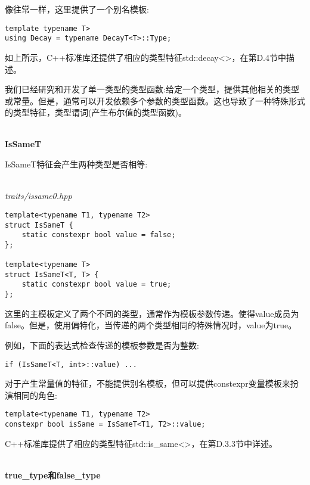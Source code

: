 像往常一样，这里提供了一个别名模板:

\begin{lstlisting}[style=styleCXX]
template typename T>
using Decay = typename DecayT<T>::Type;
\end{lstlisting}

如上所示，C++标准库还提供了相应的类型特征std::decay<>，在第D.4节中描述。


我们已经研究和开发了单一类型的类型函数:给定一个类型，提供其他相关的类型或常量。但是，通常可以开发依赖多个参数的类型函数。这也导致了一种特殊形式的类型特征，类型谓词(产生布尔值的类型函数)。

\hspace*{\fill} \\ %
\noindent
\textbf{IsSameT}

IsSameT特征会产生两种类型是否相等:

\hspace*{\fill} \\ %
\noindent
\textit{traits/issame0.hpp}
\begin{lstlisting}[style=styleCXX]
template<typename T1, typename T2>
struct IsSameT {
	static constexpr bool value = false;
};

template<typename T>
struct IsSameT<T, T> {
	static constexpr bool value = true;
};
\end{lstlisting}

这里的主模板定义了两个不同的类型，通常作为模板参数传递。使得value成员为false。但是，使用偏特化，当传递的两个类型相同的特殊情况时，value为true。

例如，下面的表达式检查传递的模板参数是否为整数:

\begin{lstlisting}[style=styleCXX]
if (IsSameT<T, int>::value) ...
\end{lstlisting}

对于产生常量值的特征，不能提供别名模板，但可以提供constexpr变量模板来扮演相同的角色:

\begin{lstlisting}[style=styleCXX]
template<typename T1, typename T2>
constexpr bool isSame = IsSameT<T1, T2>::value;
\end{lstlisting}

C++标准库提供了相应的类型特征std::is\_same<>，在第D.3.3节中详述。

\hspace*{\fill} \\ %
\noindent
\textbf{true\_type和false\_type}

